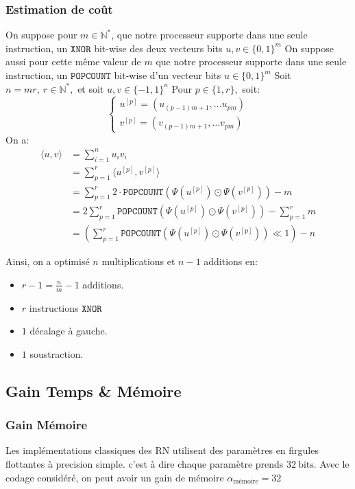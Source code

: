 	\subsubsection{Estimation de coût}
	 On suppose pour $m\in \mathbb{N}^*$, que notre processeur supporte dans une seule instruction, un $\mathtt{XNOR}$ bit-wise des deux vecteurs bits $u,v\in\{0,1\}^m$  
	\newline On suppose aussi pour cette même valeur de $m$ que notre processeur supporte dans une seule instruction, un $\mathtt{POPCOUNT}$ bit-wise d'un vecteur bits $u\in\{0,1\}^m$  
	\newline Soit $n=mr, \ r\in\mathbb{N}^*,$ et soit $u,v\in\{-1,1\}^n$ 
	\newline Pour $p\in\{1,r\},$ soit: 
	$$\begin{cases}
		u^{[p]}=(u_{(p-1)m+1},\dots u_{pm}) \\ v^{[p]}=(v_{(p-1)m+1},\dots v_{pm})
		\end{cases}$$
	On a:
	\begin{align*}
		\langle u ,v\rangle &= \sum_{i=1}^{n} u_iv_i\\
		&= \sum_{p=1}^r \langle u^{[p]},v^{[p]}  \rangle \\
		&= \sum_{p=1}^r 2\cdot \mathtt{POPCOUNT}\left(\Psi\left(u^{[p]}\right) \odot \Psi\left(v^{[p]}\right)\right) - m \\
		&= 2\sum_{p=1}^r  \mathtt{POPCOUNT}\left(\Psi\left(u^{[p]}\right) \odot \Psi\left(v^{[p]}\right)\right) - \sum_{p=1}^r m \\
		&= \left( \sum_{p=1}^r  \mathtt{POPCOUNT}\left(\Psi\left(u^{[p]}\right) \odot \Psi\left(v^{[p]}\right)\right)  \ll 1\right)-n
	\end{align*}

	Ainsi, on a optimisé $n$ multiplications et $n-1$ additions en:
	\begin{itemize}
		\item $r-1=\frac{n}{m}-1$ additions.
		\item $r$ instructions $\mathtt{XNOR}$
		\item $1$ décalage à gauche.
		\item $1$ soustraction.
	\end{itemize} 
\pagebreak
\subsection{Gain Temps \& Mémoire}
\subsubsection{Gain Mémoire}
Les implémentations classiques des RN utilisent des paramètres en firgules flottantes à precision simple. c'est à dire chaque paramètre prends $32 \ \text{bits}.$
\newline Avec le codage considéré, on peut avoir un gain de mémoire $\alpha_{\text{mémoire}}=32$

